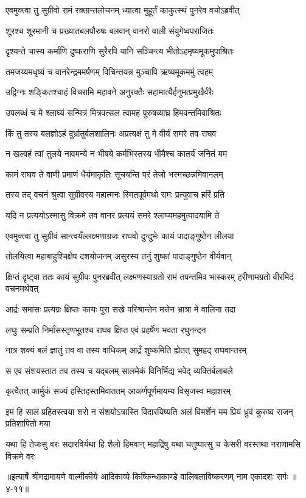 \twolineshloka
{एवमुक्त्वा तु सुग्रीवो रामं रक्तान्तलोचनम्}
{ध्यात्वा मुहूर्तं काकुत्स्थं पुनरेव वचोऽब्रवीत्} %

\twolineshloka
{शूरश्च शूरमानी च प्रख्यातबलपौरुषः}
{बलवान् वानरो वाली संयुगेष्वपराजितः} %

\twolineshloka
{दृश्यन्ते चास्य कर्माणि दुष्कराणि सुरैरपि}
{यानि सञ्चिन्त्य भीतोऽहमृष्यमूकमुपाश्रितः} %

\twolineshloka
{तमजय्यमधृष्यं च वानरेन्द्रममर्षणम्}
{विचिन्तयन्न मुञ्चापि ऋष्यमूकममुं त्वहम्} %

\twolineshloka
{उद्विग्नः शङ्कितश्चाहं विचरामि महावने}
{अनुरक्तैः सहामात्यैर्हनुमत्प्रमुखैर्वरैः} %

\twolineshloka
{उपलब्धं च मे श्लाघ्यं सन्मित्रं मित्रवत्सल}
{त्वामहं पुरुषव्याघ्र हिमवन्तमिवाश्रितः} %

\twolineshloka
{किं तु तस्य बलज्ञोऽहं दुर्भ्रातुर्बलशालिनः}
{अप्रत्यक्षं तु मे वीर्यं समरे तव राघव} %

\twolineshloka
{न खल्वहं त्वां तुलये नावमन्ये न भीषये}
{कर्मभिस्तस्य भीमैश्च कातर्यं जनितं मम} %

\twolineshloka
{कामं राघव ते वाणी प्रमाणं धैर्यमाकृतिः}
{सूचयन्ति परं तेजो भस्मच्छन्नमिवानलम्} %

\twolineshloka
{तस्य तद् वचनं श्रुत्वा सुग्रीवस्य महात्मनः}
{स्मितपूर्वमथो रामः प्रत्युवाच हरिं प्रति} %

\twolineshloka
{यदि न प्रत्ययोऽस्मासु विक्रमे तव वानर}
{प्रत्ययं समरे श्लाघ्यमहमुत्पादयामि ते} %

\twolineshloka
{एवमुक्त्वा तु सुग्रीवं सान्त्वयँल्लक्ष्मणाग्रजः}
{राघवो दुन्दुभेः कायं पादाङ्गुष्ठेन लीलया} %

\twolineshloka
{तोलयित्वा महाबाहुश्चिक्षेप दशयोजनम्}
{असुरस्य तनुं शुष्कां पादाङ्गुष्ठेन वीर्यवान्} %

\threelineshloka
{क्षिप्तं दृष्ट्वा ततः कायं सुग्रीवः पुनरब्रवीत्}
{लक्ष्मणस्याग्रतो रामं तपन्तमिव भास्करम्}
{हरीणामग्रतो वीरमिदं वचनमर्थवत्} %

\twolineshloka
{आर्द्रः समांसः प्रत्यग्रः क्षिप्तः कायः पुरा सखे}
{परिश्रान्तेन मत्तेन भ्रात्रा मे वालिना तदा} %

\twolineshloka
{लघुः सम्प्रति निर्मांसस्तृणभूतश्च राघव}
{क्षिप्त एवं प्रहर्षेण भवता रघुनन्दन} %

\twolineshloka
{नात्र शक्यं बलं ज्ञातुं तव वा तस्य वाधिकम्}
{आर्द्रं शुष्कमिति ह्येतत् सुमहद् राघवान्तरम्} %

\twolineshloka
{स एव संशयस्तात तव तस्य च यद्बलम्}
{सालमेकं विनिर्भिद्य भवेद् व्यक्तिर्बलाबले} %

\twolineshloka
{कृत्वैतत् कार्मुकं सज्यं हस्तिहस्तमिवाततम्}
{आकर्णपूर्णमायम्य विसृजस्व महाशरम्} %

\twolineshloka
{इमं हि सालं प्रहितस्त्वया शरो न संशयोऽत्रास्ति विदारयिष्यति}
{अलं विमर्शेन मम प्रियं ध्रुवं कुरुष्व राजन् प्रतिशापितो मया} %

\twolineshloka
{यथा हि तेजःसु वरः सदारविर्यथा हि शैलो हिमवान् महाद्रिषु}
{यथा चतुष्पात्सु च केसरी वरस्तथा नराणामसि विक्रमे वरः} %


॥इत्यार्षे श्रीमद्रामायणे वाल्मीकीये आदिकाव्ये किष्किन्धाकाण्डे वालिबलाविष्करणम् नाम एकादशः सर्गः ॥४-११॥
